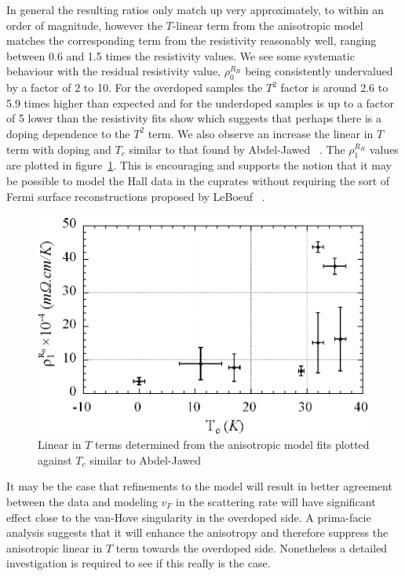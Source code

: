 In general the resulting ratios only match up very approximately, to within an order of magnitude, however the $T$-linear term from the anisotropic model matches the corresponding term from the resistivity reasonably well, ranging between 0.6 and 1.5 times the resistivity values. We see some systematic behaviour with the residual resistivity value, $\rho_0^{R_H}$ being consistently undervalued by a factor of 2 to 10. For the overdoped samples the $T^2$ factor is around 2.6 to 5.9 times higher than expected and for the underdoped samples is up to a factor of 5 lower than the resistivity fits show which suggests that perhaps there is a doping dependence to the $T^2$ term. We also observe an increase the linear in $T$ term with doping and $T_c$ similar to that found by Abdel-Jawed \etal~\cite{Abdel-Jawad2007}. The $\rho_1^{R_H}$ values are plotted in figure~\ref{Fig:ResH:G1ScalingTc}. This is encouraging and supports the notion that it may be possible to model the Hall data in the cuprates without requiring the sort of Fermi surface reconstructions proposed by LeBoeuf \etal~\cite{LeBoeuf2011}.
\begin{figure}[htbp]
    \begin{center}
        \includegraphics[scale=0.7]{Chapter-HallBSCO/Figures/G1ScalingTc/G1ScalingTc}
        \caption{Linear in $T$ terms determined from the anisotropic model fits plotted against $T_c$ similar to Abdel-Jawed \etal~\cite{Abdel-Jawad2007}}
        \label{Fig:ResH:G1ScalingTc}
    \end{center}
\end{figure}

It may be the case that refinements to the model will result in better agreement between the data and modeling $v_F$ in the scattering rate will have significant effect close to the van-Hove singularity in the overdoped side. A prima-facie analysis suggests that it will enhance the anisotropy and therefore suppress the anisotropic linear in $T$ term towards the overdoped side. Nonetheless a detailed investigation is required to see if this really is the case.

